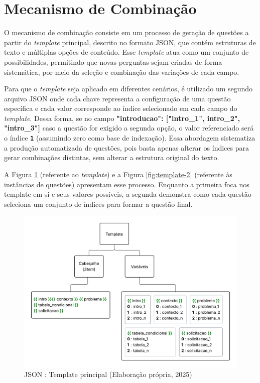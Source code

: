 \section{Mecanismo de Combinação}

O mecanismo de combinação consiste em um processo de geração de questões a partir do \textit{template} principal, descrito no formato JSON, que contém estruturas de texto e múltiplas opções de conteúdo. Esse \textit{template} atua como um conjunto de possibilidades, permitindo que novas perguntas sejam criadas de forma sistemática, por meio da seleção e combinação das variações de cada campo.

Para que o \textit{template} seja aplicado em diferentes cenários, é utilizado um segundo arquivo JSON onde cada chave representa a configuração de uma questão específica e cada valor corresponde ao índice selecionado em cada campo do \textit{template}. Dessa forma, se no campo \textbf{"introducao": ["intro\_1", intro\_2", "intro\_3"]} caso a questão for exigido a segunda opção, o valor referenciado será o índice \texttt{\textbf{1}} (assumindo zero como base de indexação). Essa abordagem sistematiza a produção automatizada de questões, pois basta apenas alterar os índices para gerar combinações distintas, sem alterar a estrutura original do texto.

A Figura \ref{fig:template-1} (referente ao \textit{template}) e a Figura \ref{fig:template-2} (referente às instâncias de questões) apresentam esse processo. Enquanto a primeira foca nos template em si e seus valores possíveis, a segunda demonstra como cada questão seleciona um conjunto de índices para formar a questão final. 

\begin{figure}[ht]
	\centering
	\includegraphics[width=16cm]{./imagens/capitulo5/template-1}
	\caption{JSON : Template principal (Elaboração própria, 2025) }
	\label{fig:template-1}
\end{figure}

